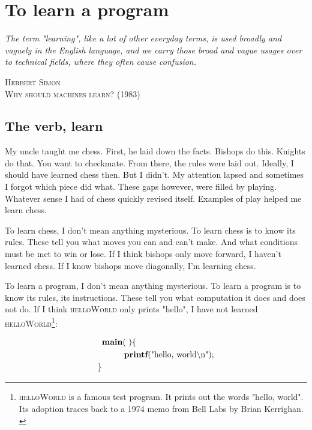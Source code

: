 \chapter{To learn a program}
\begin{singlespace}
\setlength{\epigraphwidth}{0.6\textwidth}
\epigraph{\textit{The term "learning", like a lot of other everyday terms, is used broadly and vaguely in the English language, and we carry those broad and vague usages over to technical fields, where they often cause confusion.}}{\textsc{Herbert Simon \\  Why should machines learn? (1983)}}
\end{singlespace}

\section{The verb, learn}
My uncle taught me chess. First, he laid down the facts. Bishops do this. Knights do that. You want to checkmate. From there, the rules were laid out. Ideally, I should have learned chess then. But I didn't. My attention lapsed and sometimes I forgot which piece did what. These gaps however, were filled by playing. Whatever sense I had of chess quickly revised itself. Examples of play helped me learn chess.

To learn chess, I don't mean anything mysterious. To learn chess is to know its rules. These tell you what moves you can and can't make. And what conditions must be met to win or lose. If I think bishops only move forward, I haven't learned chess. If I know bishops move diagonally, I'm learning chess. 

To learn a program, I don't mean anything mysterious. To learn a program is to know its rules, its instructions. These tell you what computation it does and does not do. If I think \textsc{helloWorld} only prints "hello", I have not learned \textsc{helloWorld}\footnote{\textsc{helloWorld} is a famous test program. It prints out the words "hello, world". Its adoption traces back to a 1974 memo from Bell Labs by Brian Kerrighan. \cite{kernighan1974programming}}:
\begin{singlespace}
\begin{align*}
&\textbf{ma}\textbf{{in}}\text{( )\{}\\
&\textbf{\hspace{2.3em}printf}\text{("hello, world{\small\textbackslash}n");}\\
\}&
\end{align*}
\end{singlespace}

